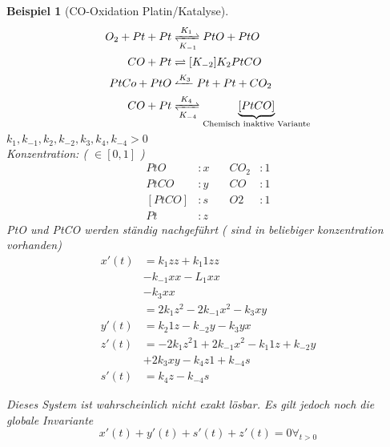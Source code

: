 \documentclass[11pt]{book}
\theoremstyle{break}
\theoremstyle{myStyle}
\newcounter{myCounter}[chapter]
\newtheorem{Bsp}[myCounter]{Beispiel}
\begin{document}
\begin{Bsp}[CO-Oxidation Platin/Katalyse]
  \begin{align*}
    O_2 + Pt + Pt &\xrightleftharpoons[K_{-1}]{K_1} PtO + PtO \\
    CO + Pt &\rightleftharpoons[K_{-2}]{K_2} PtCO \\
    PtCo + PtO &\xleftharpoonup{K_3} Pt + Pt + CO_2 \\
         CO + Pt &\xrightleftharpoons[K_{-4}]{K_4} \underbrace{[PtCO]}_{\text{Chemisch inaktive Variante}}
  \end{align*}
  \( k_1,k_{-1},k_2,k_{-2},k_3,k_4,k_{-4} > 0 \) \\
  Konzentration: ( \( \in [0,1] \) )
  \begin{align*}
       PtO&: x \quad & CO_2&: 1 \\
      PtCO&: y \quad & CO&: 1 \\
    [PtCO]&: s \quad & O2&: 1\\
      Pt&: z &&
  \end{align*}
  PtO und PtCO werden st\"andig nachgef\"uhrt ( sind in beliebiger konzentration vorhanden)
  \begin{align*}
    x'(t) &=   k_1 z z + k_1 1 z z \\
          &   -k_{-1} x x - L_1 x x \\
          &   -k_3 x x \\
          &=  2 k_1 z^2 - 2 k_{-1} x^2 - k_3 x y \\
    y'(t) &=   k_2 1 z - k_{-2} y - k_3 y x \\
    z'(t) &= -2k_1 z^2 1 + 2 k_{-1} x^2 - k_1 1  z + k_{-2} y \\
          &  +2k_3 x y - k_4 z 1 + k_{-4} s \\
    s'(t) &=   k_4 z - k_{-4} s
  \end{align*}

  Dieses System ist wahrscheinlich nicht exakt l\"osbar. Es gilt jedoch noch die
  globale Invariante \[ x'(t) + y'(t) + s'(t) + z'(t) = 0 \forall_{t>0} \]

\end{Bsp}
\end{document}
